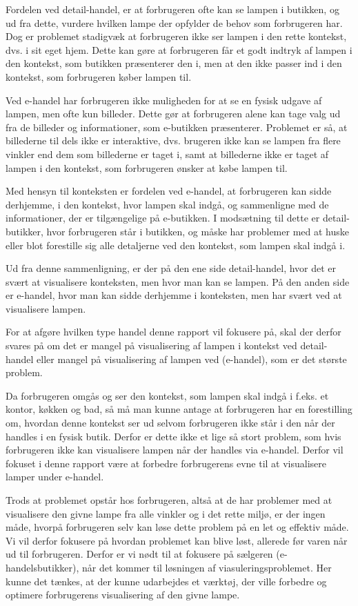 Fordelen ved detail-handel, er at forbrugeren ofte kan se lampen i butikken, og ud fra dette, vurdere hvilken lampe der opfylder de behov som forbrugeren har. Dog er problemet stadigvæk at forbrugeren ikke ser lampen i den rette kontekst, dvs. i sit eget hjem. Dette kan gøre at forbrugeren får et godt indtryk af lampen i den kontekst, som butikken præsenterer den i, men at den ikke passer ind i den kontekst, som forbrugeren køber lampen til.

Ved e-handel har forbrugeren ikke muligheden for at se en fysisk udgave af lampen, men ofte kun billeder. Dette gør at forbrugeren alene kan tage valg ud fra de billeder og informationer, som e-butikken præsenterer. Problemet er så, at billederne til dels ikke er interaktive, dvs. brugeren ikke kan se lampen fra flere vinkler end dem som billederne er taget i, samt at billederne ikke er taget af lampen i den kontekst, som forbrugeren ønsker at købe lampen til. 

Med hensyn til konteksten er fordelen ved e-handel, at forbrugeren kan sidde derhjemme, i den kontekst, hvor lampen skal indgå, og sammenligne med de informationer, der er tilgængelige på e-butikken. I modsætning til dette er detail-butikker, hvor forbrugeren står i butikken, og måske har problemer med at huske eller blot forestille sig alle detaljerne ved den kontekst, som lampen skal indgå i.

Ud fra denne sammenligning, er der på den ene side detail-handel, hvor det er svært at visualisere konteksten, men hvor man kan se lampen. På den anden side er e-handel, hvor man kan sidde derhjemme i konteksten, men har svært ved at visualisere lampen. 

For at afgøre hvilken type handel denne rapport vil fokusere på, skal der derfor svares på om det er mangel på visualisering af lampen i kontekst ved detail-handel eller mangel på visualisering af lampen ved (e-handel), som er det største problem.

Da forbrugeren omgås og ser den kontekst, som lampen skal indgå i f.eks. et kontor, køkken og bad, så må man kunne antage at forbrugeren har en forestilling om, hvordan denne kontekst ser ud selvom forbrugeren ikke står i den når der handles i en fysisk butik. Derfor er dette ikke et lige så stort problem, som hvis forbrugeren ikke kan visualisere lampen når der handles via e-handel. Derfor vil fokuset i denne rapport være at forbedre forbrugerens evne til at visualisere lamper under e-handel.


Trods at problemet opstår hos forbrugeren, altså at de har problemer med at visualisere den givne lampe fra alle vinkler og i det rette miljø, er der ingen måde, hvorpå forbrugeren selv kan løse dette problem på en let og effektiv måde. Vi vil derfor fokusere på hvordan  problemet kan blive løst, allerede før varen når ud til forbrugeren. Derfor er vi nødt til at fokusere på sælgeren (e-handelsbutikker), når det kommer til løsningen af viasuleringsproblemet. Her kunne det tænkes, at der kunne udarbejdes et værktøj, der ville forbedre og optimere forbrugerens visualisering af den givne lampe.






